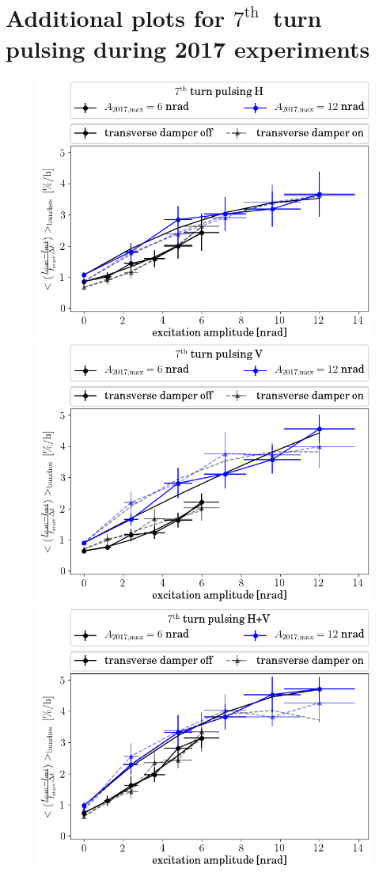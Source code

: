 \documentclass[%
 reprint,
 amsmath,amssymb,
 aps,
prstab,
]{revtex4-1}
\begin{document}
\newpage

\section{Additional plots for $7^{\mathrm{th}}$~turn pulsing during 2017 experiments}
\label{app:sec:7}
\begin{figure}[h]
	\begin{minipage}[t]{1.0\linewidth}
	\centering
	\includegraphics[width=0.8\linewidth]{2017_scale_amp_7h_lbllong.png}
	\end{minipage}
	\begin{minipage}[t]{1.0\linewidth}
		\centering
		\includegraphics[width=0.8\linewidth]{2017_scale_amp_7v_lbllong.png}
	\end{minipage}
	\begin{minipage}[t]{1.0\linewidth}
		\centering
		\includegraphics[width=0.8\linewidth]{2017_scale_amp_7hv_lbllong.png}

\end{minipage}
\end{figure}
\end{document}
